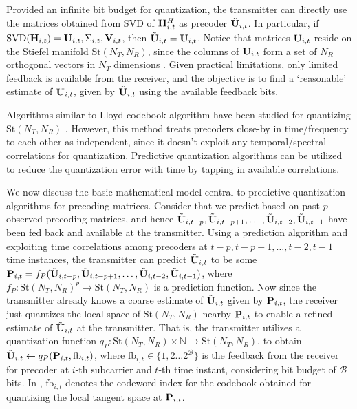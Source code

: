 \documentclass[conference]{IEEEtran}
\begin{document}
Provided an infinite bit budget for quantization, the transmitter can directly use the matrices obtained from SVD of ${\bf H}^{H}_{i,t}$ as precoder $\tilde{{\bf U}}_{i,t}$.
In particular, if $\text{SVD}({\bf H}_{i,t}) = {\bf U}_{i,t},\Sigma_{i,t}, {\bf V}_{i,t}$, then $\tilde{{\bf U}}_{i,t} = {\bf U}_{i,t}$.
Notice that matrices ${\bf U}_{i,t}$ reside on the Stiefel manifold $\text{St}(N_T,N_R)$, since the columns of ${\bf U}_{i,t}$ form a set of $N_R$ orthogonal vectors in $N_T$ dimensions \cite{Gupt1905:Predictive,6891198}.  Given practical limitations, only limited feedback is available from the receiver, and the objective is to find a `reasonable' estimate of ${\bf U}_{i,t}$, given by $\tilde{{\bf U}}_{i,t}$ using the available feedback bits.

Algorithms similar to Lloyd codebook algorithm have been studied for quantizing $\text{St}(N_T,N_R)$ \cite{6678348}.
However, this method treats precoders close-by in time/frequency to each other as independent, since it doesn't exploit any temporal/spectral correlations for quantization. 
Predictive quantization algorithms \cite{Gupt1905:Predictive,6891198} can be utilized to reduce the quantization error with time by tapping in available correlations.

We now discuss the basic mathematical model central to predictive quantization algorithms for precoding matrices.
Consider that we predict based on past $p$ observed precoding matrices, and hence $\tilde{{\bf U}}_{i,t-p},\tilde{{\bf U}}_{i,t-p+1},\ldots,\tilde{{\bf U}}_{i,t-2},\tilde{{\bf U}}_{i,t-1}$ have been fed back and available at the transmitter.
Using a prediction algorithm and exploiting time correlations among precoders at $t-p,t-p+1,\ldots,t-2,t-1$ time instances, the transmitter can predict $\tilde{{\bf U}}_{i,t}$ to be some ${\bf P}_{i,t}=f_P(\tilde{{\bf U}}_{i,t-p},\tilde{{\bf U}}_{i,t-p+1},\ldots,\tilde{{\bf U}}_{i,t-2},\tilde{{\bf U}}_{i,t-1})$, where $f_P: \text{St}(N_T,N_R)^p \to \text{St}(N_T,N_R)$ is a prediction function.
Now since the transmitter already knows a coarse estimate of $\tilde{{\bf U}}_{i,t}$ given by ${\bf P}_{i,t}$, the receiver just quantizes the local space of $\text{St}(N_T,N_R)$ nearby ${\bf P}_{i,t}$ to enable a refined estimate of $\tilde{{\bf U}}_{i,t}$ at the transmitter.
That is, the transmitter utilizes a quantization function $q_P:\text{St}(N_T,N_R) \times \mathbb{N} \to \text{St}(N_T,N_R)$, to obtain $\tilde{{\bf U}}_{i,t} \gets q_P({\bf P}_{i,t},\text{fb}_{i,t})$, where $\text{fb}_{i,t} \in \{1,2\ldots2^{\mathcal{B}}\}$ is the feedback from the receiver for precoder at $i$-th subcarrier and $t$-th time instant, considering bit budget of $\mathcal{B}$ bits. 
In \cite{Gupt1905:Predictive,6891198,6545375}, $\text{fb}_{i,t}$ denotes the codeword index for the codebook obtained for quantizing the local tangent space at ${\bf P}_{i,t}$.
\end{document}
